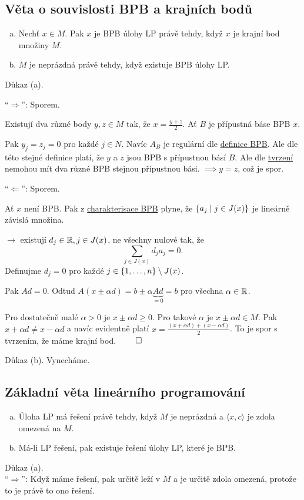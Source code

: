 \subsection{Věta o souvislosti BPB a krajních bodů}
\begin{enumerate}[(a)]
    \item Nechť $x \in M$. Pak $x$ je BPB úlohy LP právě tehdy, když $x$ je krajní bod množiny $M$.
    \item $M$ je neprázdná právě tehdy, když existuje BPB úlohy LP.
\end{enumerate}

Důkaz (a).

\enquote{$\Rightarrow$}: Sporem.

Existují dva různé body $y, z \in M$ tak, že $x = \frac{y+z}{2}$. Ať $B$ je přípustná báse BPB $x$.

Pak $y_j = z_j = 0$ pro každé $j \in N$. Navíc $A_B$ je regulární dle \hyperref[BPB]{definice BPB}. Ale dle této stejné
definice platí, že $y$ a $z$ jsou BPB s přípustnou básí $B$. Ale dle \hyperref[ruzneBPB]{tvrzení} nemohou mít dva různé
BPB stejnou přípustnou bási. $\implies y = z$, což je spor.

\enquote{$\Leftarrow$}: Sporem.

Ať $x$ není BPB. Pak z \hyperref[charBPB]{charakterisace BPB} plyne, že $\left\lbrace a_j \mid j \in J(x) \right\rbrace$ je lineárně závislá
množina.

$\rightarrow$ existují $d_j \in \mathbb{R}, j \in J(x)$, ne všechny nulové tak, že
\[
    \sum_{j\in J(x)} d_j a_j = 0.
\]
Definujme $d_j = 0$ pro každé $j \in \left\lbrace 1, \dots, n \right\rbrace \setminus J(x)$.

Pak $A d = 0$. Odtud $A(x\pm \alpha d) = b \pm \alpha \underbrace{A d}_{=0} = b$ pro všechna $\alpha \in \mathbb{R}$.

Pro dostatečně malé $\alpha > 0$ je $x \pm \alpha d \geq 0$. Pro takové $\alpha$ je $x \pm \alpha d \in M$. Pak
$x + \alpha d \not = x - \alpha d$ a navíc evidentně platí $x = \frac{(x+\alpha d) + (x - \alpha d)}{2}$. To je spor s
tvrzením, že máme krajní bod. $\qed$

Důkaz (b). Vynecháme.

\subsection{Základní věta lineárního programování}
\begin{enumerate}[(a)]
    \item Úloha LP má řešení právě tehdy, když $M$ je neprázdná a $\langle x, c\rangle$ je zdola omezená na $M$.
    \item Má-li LP řešení, pak existuje řešení úlohy LP, které je BPB.
\end{enumerate}
Důkaz (a).\\
\enquote{$\Rightarrow$}: Když máme řešení, pak určitě leží v $M$ a je určitě zdola omezená, protože to je právě to ono
řešení.

